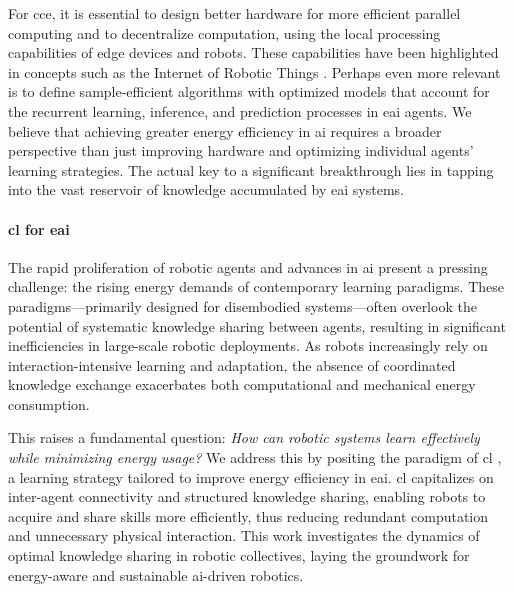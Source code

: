 \documentclass[12pt]{article}
\renewcommand{\emph}[1]{\textit{#1}}
\begin{document}
For \ac{cce}, it is essential to design better hardware for more efficient parallel computing and to decentralize computation, using the local processing capabilities of edge devices and robots. These capabilities have been highlighted in concepts such as the Internet of Robotic Things \cite{Vermesan2020InternetRoboticThings,Sekala2024SelectedIssuesMethods}. Perhaps even more relevant is to define sample-efficient algorithms with optimized models that account for the recurrent learning, inference, and prediction processes in \ac{eai} agents. We believe that achieving greater energy efficiency in \ac{ai} requires a broader perspective than just improving hardware and optimizing individual agents' learning strategies. The actual key to a significant breakthrough lies in tapping into the vast reservoir of knowledge accumulated by \ac{eai} systems.

\paragraph*{\Acl{cl} for \ac{eai}} The rapid proliferation of robotic agents and advances in \ac{ai} present a pressing challenge: the rising energy demands of contemporary learning paradigms. These paradigms---primarily designed for disembodied systems---often overlook the potential of systematic knowledge sharing between agents, resulting in significant inefficiencies in large-scale robotic deployments. As robots increasingly rely on interaction-intensive learning and adaptation, the absence of coordinated knowledge exchange exacerbates both computational and mechanical energy consumption.

This raises a fundamental question: \emph{How can robotic systems learn effectively while minimizing energy usage?} We address this by positing the paradigm of \acl{cl} \cite{Haddadin2014SystemzumErstellen,Haddadin2015Systemgeneratingsets}, a learning strategy tailored to improve energy efficiency in \ac{eai}. \Ac{cl} capitalizes on inter-agent connectivity and structured knowledge sharing, enabling robots to acquire and share skills more efficiently, thus reducing redundant computation and unnecessary physical interaction. This work investigates the dynamics of optimal knowledge sharing in robotic collectives, laying the groundwork for energy-aware and sustainable \ac{ai}-driven robotics.
\end{document}
